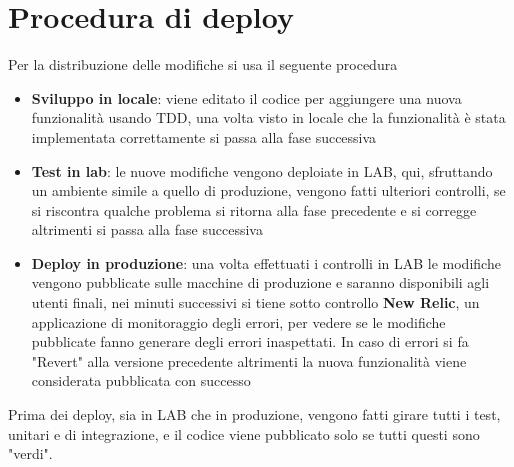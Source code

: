 \section{Procedura di deploy}
Per la distribuzione delle modifiche si usa il seguente procedura
\begin{itemize}
\item {\bf Sviluppo in locale}: viene editato il codice per aggiungere una nuova funzionalità usando
TDD, una volta visto in locale che la funzionalità è stata implementata correttamente si passa alla fase successiva
\item {\bf Test in lab}: le nuove modifiche vengono deploiate in LAB, qui, sfruttando un ambiente simile a quello di 
produzione, vengono fatti ulteriori controlli, se si riscontra qualche problema si ritorna alla fase precedente e si corregge
altrimenti si passa alla fase successiva 
\item {\bf Deploy in produzione}: una volta effettuati i controlli in LAB le modifiche vengono pubblicate sulle macchine
di produzione e saranno disponibili agli utenti finali, nei minuti successivi si tiene sotto controllo {\bf New Relic}, un
applicazione di monitoraggio degli errori, per vedere se le modifiche pubblicate fanno generare degli errori inaspettati.
In caso di errori si fa "Revert" alla versione precedente altrimenti la nuova funzionalità viene considerata pubblicata con successo
\end{itemize}

Prima dei deploy, sia in LAB che in produzione, vengono fatti girare tutti i test, unitari e di integrazione, e il codice viene pubblicato solo se tutti questi sono "verdi".